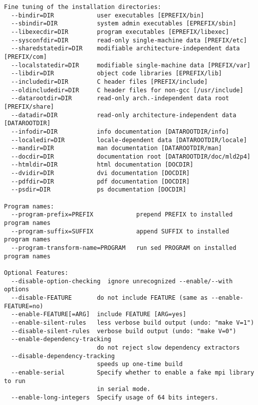 \begin{verbatim}
Fine tuning of the installation directories:
  --bindir=DIR            user executables [EPREFIX/bin]
  --sbindir=DIR           system admin executables [EPREFIX/sbin]
  --libexecdir=DIR        program executables [EPREFIX/libexec]
  --sysconfdir=DIR        read-only single-machine data [PREFIX/etc]
  --sharedstatedir=DIR    modifiable architecture-independent data [PREFIX/com]
  --localstatedir=DIR     modifiable single-machine data [PREFIX/var]
  --libdir=DIR            object code libraries [EPREFIX/lib]
  --includedir=DIR        C header files [PREFIX/include]
  --oldincludedir=DIR     C header files for non-gcc [/usr/include]
  --datarootdir=DIR       read-only arch.-independent data root [PREFIX/share]
  --datadir=DIR           read-only architecture-independent data [DATAROOTDIR]
  --infodir=DIR           info documentation [DATAROOTDIR/info]
  --localedir=DIR         locale-dependent data [DATAROOTDIR/locale]
  --mandir=DIR            man documentation [DATAROOTDIR/man]
  --docdir=DIR            documentation root [DATAROOTDIR/doc/mld2p4]
  --htmldir=DIR           html documentation [DOCDIR]
  --dvidir=DIR            dvi documentation [DOCDIR]
  --pdfdir=DIR            pdf documentation [DOCDIR]
  --psdir=DIR             ps documentation [DOCDIR]

Program names:
  --program-prefix=PREFIX            prepend PREFIX to installed program names
  --program-suffix=SUFFIX            append SUFFIX to installed program names
  --program-transform-name=PROGRAM   run sed PROGRAM on installed program names

Optional Features:
  --disable-option-checking  ignore unrecognized --enable/--with options
  --disable-FEATURE       do not include FEATURE (same as --enable-FEATURE=no)
  --enable-FEATURE[=ARG]  include FEATURE [ARG=yes]
  --enable-silent-rules   less verbose build output (undo: "make V=1")
  --disable-silent-rules  verbose build output (undo: "make V=0")
  --enable-dependency-tracking
                          do not reject slow dependency extractors
  --disable-dependency-tracking
                          speeds up one-time build
  --enable-serial         Specify whether to enable a fake mpi library to run
                          in serial mode.
  --enable-long-integers  Specify usage of 64 bits integers.


\end{verbatim}
